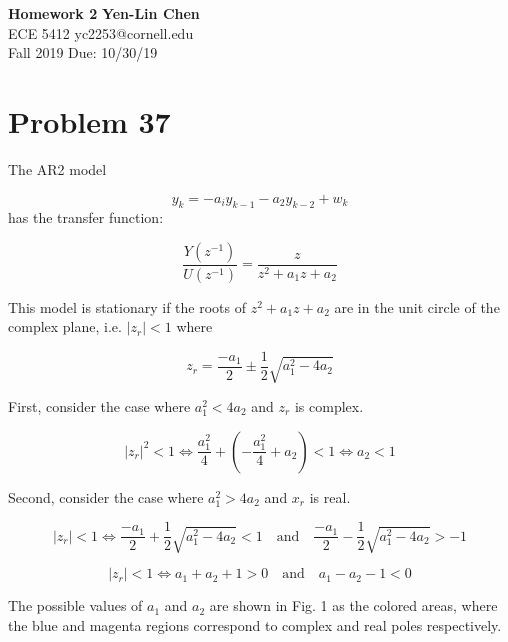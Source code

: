 \documentclass[a4paper, 11pt]{article}
\begin{document}
\noindent
\large\textbf{Homework 2} \hfill \textbf{Yen-Lin Chen} \\
\normalsize ECE 5412 \hfill yc2253@cornell.edu \\
Fall 2019 \hfill Due: 10/30/19\\



\section*{Problem 37}

The AR2 model

\begin{equation}
y_k = -a_iy_{k-1}-a_2y_{k-2} + w_k 
\end{equation}
has the transfer function:

\begin{equation}
\frac{Y(z^{-1})}{U(z^{-1})} = \frac{z}{z^2+a_1z+a_2} 
\end{equation}

This model is stationary if the roots of $z^2+a_1z+a_2$ are in the unit circle of the complex plane, i.e. $|z_r| < 1$ where

\begin{equation}
z_r = \frac{-a_1}{2} \pm \frac{1}{2}\sqrt{a_1^2-4a_2}
\end{equation} 

First, consider the case where $a_1^2 < 4a_2$ and $z_r$ is complex. 

\begin{equation}
|z_r|^2 < 1 \iff \frac{a_1^2}{4} + \left(-\frac{a_1^2}{4} +a_2 \right) < 1 \iff a_2 < 1
\end{equation}

Second, consider the case where $a_1^2 > 4a_2$ and $x_r$ is real. 

\begin{equation}
|z_r| < 1 \iff \frac{-a_1}{2} + \frac{1}{2}\sqrt{a_1^2-4a_2} < 1 \quad \text{and} \quad \frac{-a_1}{2} - \frac{1}{2}\sqrt{a_1^2-4a_2} > -1
\end{equation}

\begin{equation}
|z_r| < 1 \iff a_1+a_2+1>0 \quad \text{and} \quad a_1-a_2-1<0
\end{equation}

The possible values of $a_1$ and $a_2$ are shown in Fig. 1 as the colored areas, where the blue and magenta regions correspond to complex and real poles respectively. 
\end{document}
